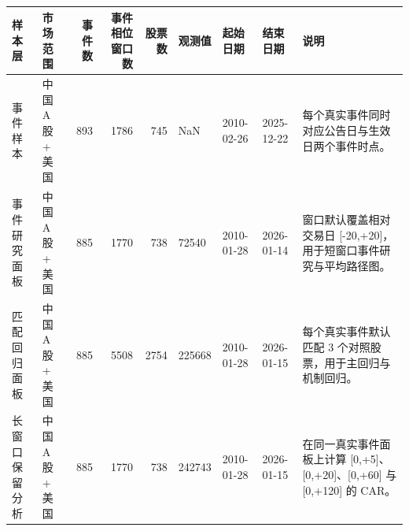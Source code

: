 \begin{tabular}{llrrrllll}
\toprule
样本层 & 市场范围 & 事件数 & 事件相位窗口数 & 股票数 & 观测值 & 起始日期 & 结束日期 & 说明 \\
\midrule
事件样本 & 中国 A 股 + 美国 & 893 & 1786 & 745 & NaN & 2010-02-26 & 2025-12-22 & 每个真实事件同时对应公告日与生效日两个事件时点。 \\
事件研究面板 & 中国 A 股 + 美国 & 885 & 1770 & 738 & 72540 & 2010-01-28 & 2026-01-14 & 窗口默认覆盖相对交易日 [-20,+20]，用于短窗口事件研究与平均路径图。 \\
匹配回归面板 & 中国 A 股 + 美国 & 885 & 5508 & 2754 & 225668 & 2010-01-28 & 2026-01-15 & 每个真实事件默认匹配 3 个对照股票，用于主回归与机制回归。 \\
长窗口保留分析 & 中国 A 股 + 美国 & 885 & 1770 & 738 & 242743 & 2010-01-28 & 2026-01-15 & 在同一真实事件面板上计算 [0,+5]、[0,+20]、[0,+60] 与 [0,+120] 的 CAR。 \\
\bottomrule
\end{tabular}
